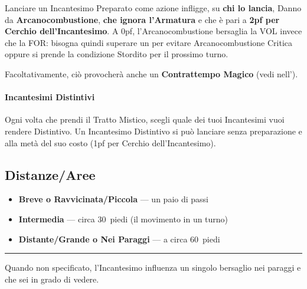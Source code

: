 \documentclass[itdr]{subfiles}
\begin{document}
Lanciare un Incantesimo Preparato come azione infligge, su \textbf{chi lo lancia}, \mbox{Danno} da \mbox{\textbf{Arcanocombustione}}, \textbf{che ignora l’Armatura} e che è pari a \textbf{2pf per Cerchio dell’Incantesimo}. A 0pf, l’Arcanocombustione bersaglia la VOL \mbox{invece} che la FOR: bisogna quindi superare un  per evitare Arcanocombustione Critica oppure si prende la condizione Stordito per il prossimo turno.

\begin{dbox}
	Facoltativamente, ciò provocherà anche un \textbf{Contrattempo Magico} (vedi \textbf{} nell'\textbf{}).
\end{dbox}

\vfill
{}
\paragraph{Incantesimi Distintivi}
Ogni volta che prendi il Tratto Mistico, scegli quale dei tuoi Incantesimi vuoi rendere Distintivo. Un Incantesimo Distintivo si può lanciare senza preparazione e alla metà del suo costo (1pf per Cerchio dell’Incantesimo).

\vfill
{}

\break

\begin{dbox}
	\subsection*{Distanze/Aree}
	\begin{itemize}
		\item \textbf{Breve o Ravvicinata/Piccola} --- un paio di passi
		\item \textbf{Intermedia} --- circa 30~piedi (il movimento in un turno)
		\item \textbf{Distante/Grande o Nei Paraggi} --- a circa 60~piedi
	\end{itemize}
	\vspace{1ex}
	\hrule
	\vspace{1ex}
	Quando non specificato, l’Incantesimo influenza un singolo bersaglio nei paraggi e che sei in grado di vedere.
\end{dbox}
\end{document}
